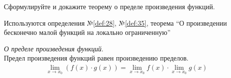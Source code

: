 \begin{question}
    Сформулируйте и докажите теорему о пределе произведения функций.
\end{question}
\begin{used}
    Используются определения №\ref{def:28}, №\ref{def:35}, теорема ``О произведении бесконечно малой функций на локально ограниченную''
\end{used}
\begin{theorem}
    \textit{О пределе произведения функций}. \\
    Предел произведения функций равен произведению пределов.
    \begin{gather*}
        \lim_{x \to x_0} (f(x) \cdot g(x)) = \lim_{x \to x_0} f(x) \cdot \lim_{x \to x_0} g(x)
    \end{gather*}
\end{theorem}
